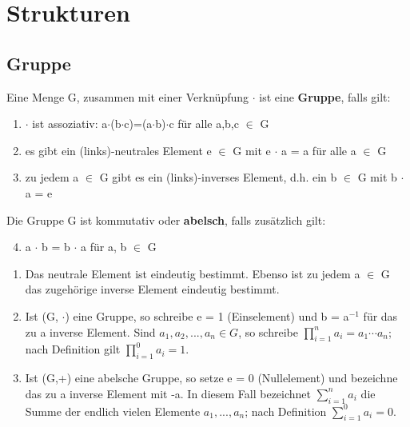 \chapter{Strukturen}
\section{Gruppe}
\begin{definition}
Eine Menge G, zusammen mit einer Verknüpfung $\cdot$ ist eine \textbf{Gruppe}, falls gilt:
\begin{enumerate}
\item $\cdot$ ist assoziativ: a$\cdot$(b$\cdot$c)=(a$\cdot$b)$\cdot$c für alle a,b,c $\in$ G
\item es gibt ein (links)-neutrales Element e $\in$ G mit e $\cdot$ a = a für alle a $\in$ G 
\item zu jedem a $\in$ G gibt es ein (links)-inverses Element, d.h. ein b $\in$ G mit b $\cdot$ a = e
\end{enumerate}
\hspace*{3mm} Die Gruppe G ist kommutativ oder \textbf{abelsch}, falls zusätzlich gilt:
\begin{enumerate}
\setcounter{enumi}{3}
\item a $\cdot$ b = b $\cdot$ a für a, b $\in$ G
\end{enumerate}
\end{definition}

\begin{remark}
\leavevmode
\begin{enumerate}
\item Das neutrale Element ist eindeutig bestimmt. Ebenso ist zu jedem a $\in$ G das zugehörige inverse Element eindeutig bestimmt.
\item Ist (G, $\cdot$) eine Gruppe, so schreibe e = 1 (Einselement) und b = a$^{-1}$ für das zu a inverse Element. Sind $a_1, a_2, . . . , a_n \in G$, so schreibe $\prod\nolimits_{i=1}^{n} a_i = a_1 \cdots a_n$; nach Definition gilt $\prod\nolimits_{i=1}^{0}a_i = 1$.
\item Ist (G,+) eine abelsche Gruppe, so setze e = 0 (Nullelement) und bezeichne das zu a inverse Element mit -a. In diesem Fall bezeichnet $\sum\nolimits_{i=1}^{n} a_i$ die Summe der endlich vielen Elemente $a_1, . . . , a_n$; nach Definition $\sum\nolimits_{i=1}^{0} a_i = 0$.
\end{enumerate}
\end{remark}


